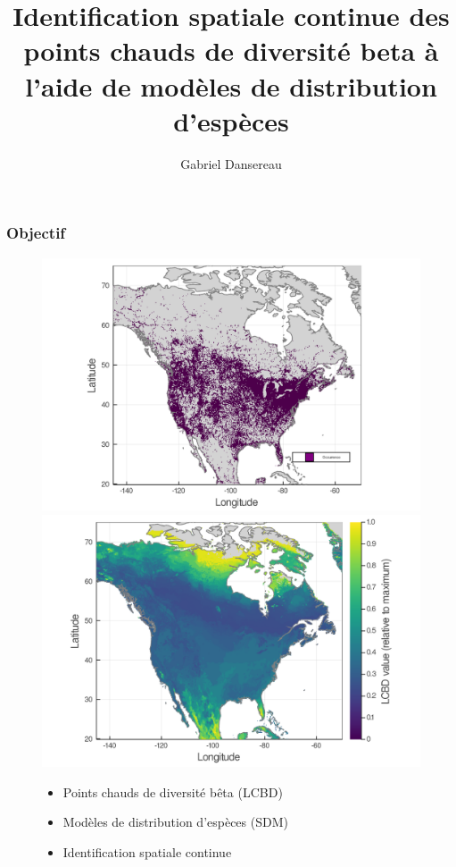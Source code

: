 \documentclass[10pt]{beamer}
\title{Identification spatiale continue des points chauds de diversité beta à l'aide de modèles de distribution d'espèces}
\author{Gabriel Dansereau}
\begin{document}
\begin{frame}
  \titlepage
\end{frame}

\begin{frame}
  \frametitle{Objectif}
  \begin{figure}
    \centering
    \hspace*{0.0cm}\includegraphics[scale=0.08]{fig/01_raw_singlesp.png}
    \hspace*{0.0cm}\includegraphics[scale=0.08]{fig/05_sdm_lcbd.png}
    \hspace{4.0cm}\begin{itemize}
      \item Points chauds de diversité bêta (LCBD)
      \item Modèles de distribution d'espèces (SDM)
      \item Identification spatiale continue
    \end{itemize}
  \end{figure}
\end{frame}
\end{document}
